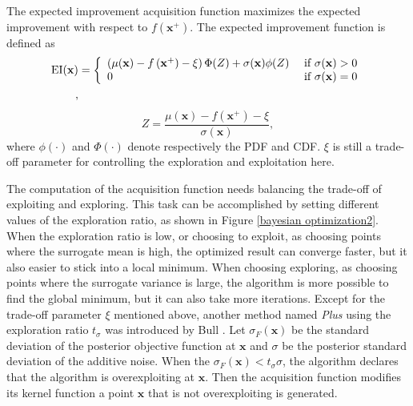 The expected improvement acquisition function maximizes the expected improvement with respect to $f(\mathbf{x}^{+})$. The expected improvement function is defined as
\begin{align} 
\centering
\mathrm{EI}(\mathbf{x}) &=\left\{\begin{array}{ll}{\left(\mu(\mathbf{x})-f\left(\mathbf{x}^{+}\right)-\xi\right) \Phi(Z)+\sigma(\mathbf{x}) \phi(Z)} & {\text { if } \sigma(\mathbf{x})>0} \\ 
{0} & {\text { if } \sigma(\mathbf{x})=0}\end{array}\right.\\, \end{align}
\begin{equation}
    Z =\frac{\mu(\mathbf{x})-f\left(\mathbf{x}^{+}\right)-\xi}{\sigma(\mathbf{x})} ,
\end{equation}
where $\phi(\cdot)$ and $\Phi(\cdot)$ denote respectively the PDF and CDF. $\xi$ is still a trade-off parameter for controlling the exploration and exploitation here.

The computation of the acquisition function needs balancing the trade-off of exploiting and exploring. This task can be accomplished by setting different values of the exploration ratio, as shown in Figure \ref{bayesian optimization2}. When the exploration ratio is low, or choosing to exploit, as choosing points where the surrogate mean is high, the optimized result can converge faster, but it also easier to stick into a local minimum. When choosing exploring, as choosing points where the surrogate variance is large, the algorithm is more possible to find the global minimum, but it can also take more iterations. Except for the trade-off parameter $\xi$ mentioned above, another method named \textit{Plus} using the exploration ratio $t_{\sigma}$ was introduced by Bull \cite{bull2011convergence}. Let $\sigma_{F}(\mathbf{x})$ be the standard deviation of the posterior objective function at $\mathbf{x}$ and $\sigma$ be the posterior standard deviation of the additive noise. When the $\sigma_{F}(\mathbf{x})<t_{\sigma}\sigma$, the algorithm declares that the algorithm is overexploiting at $\mathbf{x}$. Then the acquisition function modifies its kernel function a point $\mathbf{x}$ that is not overexploiting is generated.


